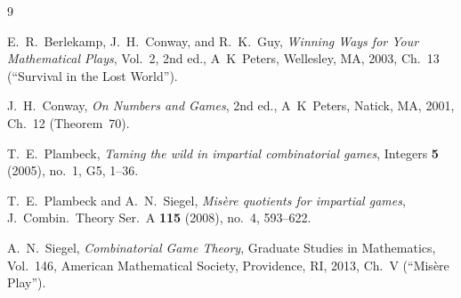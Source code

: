 \documentclass[11pt]{amsart}
\theoremstyle{definition}
\theoremstyle{remark}
\begin{document}
\begin{thebibliography}{9}

E.~R.~Berlekamp, J.~H.~Conway, and R.~K.~Guy,
\emph{Winning Ways for Your Mathematical Plays}, Vol.~2, 2nd ed.,
A~K~Peters, Wellesley, MA, 2003, Ch.~13 (``Survival in the Lost World'').

J.~H.~Conway,
\emph{On Numbers and Games}, 2nd ed.,
A~K~Peters, Natick, MA, 2001, Ch.~12 (Theorem~70).

T.~E.~Plambeck,
\emph{Taming the wild in impartial combinatorial games},
Integers \textbf{5} (2005), no.~1, G5, 1--36.

T.~E.~Plambeck and A.~N.~Siegel,
\emph{Mis\`ere quotients for impartial games},
J.~Combin.\ Theory Ser.~A \textbf{115} (2008), no.~4, 593--622.

A.~N.~Siegel,
\emph{Combinatorial Game Theory},
Graduate Studies in Mathematics, Vol.~146, American Mathematical Society, Providence, RI, 2013, Ch.~V (``Mis\`ere Play'').

\end{thebibliography}
\end{document}
